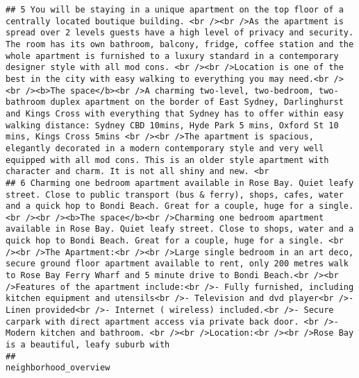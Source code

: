 \documentclass[
]{article}
\begin{document}
\begin{verbatim}
## 5 You will be staying in a unique apartment on the top floor of a centrally located boutique building. <br /><br />As the apartment is spread over 2 levels guests have a high level of privacy and security. The room has its own bathroom, balcony, fridge, coffee station and the whole apartment is furnished to a luxury standard in a contemporary designer style with all mod cons. <br /><br />Location is one of the best in the city with easy walking to everything you may need.<br /><br /><b>The space</b><br />A charming two-level, two-bedroom, two-bathroom duplex apartment on the border of East Sydney, Darlinghurst and Kings Cross with everything that Sydney has to offer within easy walking distance: Sydney CBD 10mins, Hyde Park 5 mins, Oxford St 10 mins, Kings Cross 5mins <br /><br />The apartment is spacious, elegantly decorated in a modern contemporary style and very well equipped with all mod cons. This is an older style apartment with character and charm. It is not all shiny and new. <br
## 6 Charming one bedroom apartment available in Rose Bay. Quiet leafy street. Close to public transport (bus & ferry), shops, cafes, water and a quick hop to Bondi Beach. Great for a couple, huge for a single.<br /><br /><b>The space</b><br />Charming one bedroom apartment available in Rose Bay. Quiet leafy street. Close to shops, water and a quick hop to Bondi Beach. Great for a couple, huge for a single. <br /><br />The Apartment:<br /><br />Large single bedroom in an art deco, secure ground floor apartment available to rent, only 200 metres walk to Rose Bay Ferry Wharf and 5 minute drive to Bondi Beach.<br /><br />Features of the apartment include:<br />- Fully furnished, including kitchen equipment and utensils<br />- Television and dvd player<br />- Linen provided<br />- Internet ( wireless) included.<br />- Secure carpark with direct apartment access via private back door. <br />- Modern kitchen and bathroom. <br /><br />Location:<br /><br />Rose Bay is a beautiful, leafy suburb with
##                                                                                                                                                                                                                                                                                                                                                                                                                                                                                                                                                                                                                                                                                                                                                                                                                                                                                                                                                                                                                      neighborhood_overview

\end{verbatim}
\end{document}
